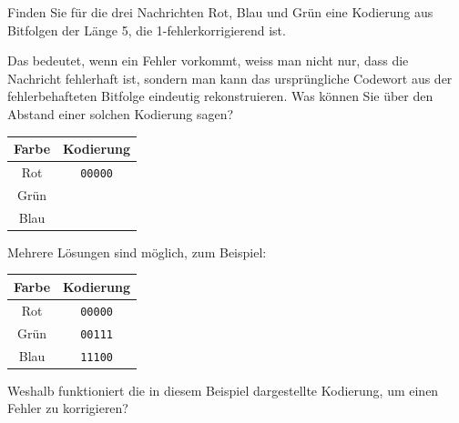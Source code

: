 \begin{myexercise}\label{ex:fehlerkorrektur}
	Finden Sie für die drei Nachrichten Rot, Blau und Grün eine Kodierung aus Bitfolgen der Länge 5, die 1-fehlerkorrigierend ist.

	Das bedeutet, wenn ein Fehler vorkommt, weiss man nicht nur, dass die Nachricht fehlerhaft ist, sondern man kann das ursprüngliche Codewort aus der fehlerbehafteten Bitfolge eindeutig rekonstruieren. Was können Sie über den Abstand einer solchen Kodierung sagen?

	\begin{table}[H]
		\centering
		\begin{tabular}{c|c}
			\textbf{Farbe} & \textbf{Kodierung} \\\midrule\midrule
			Rot            & \texttt{00000}     \\\midrule
			Grün           &                    \\\midrule
			Blau           &                    \\
		\end{tabular}
	\end{table}
	\begin{myanswer}
		Mehrere Lösungen sind möglich, zum Beispiel:

		\begin{table}[H]
			\centering
			\begin{tabular}{c|c}
				\textbf{Farbe} & \textbf{Kodierung} \\\midrule\midrule
				Rot            & \texttt{00000}     \\\midrule
				Grün           & \texttt{00111}     \\\midrule
				Blau           & \texttt{11100}     \\
			\end{tabular}
		\end{table}
		Weshalb funktioniert die in diesem Beispiel dargestellte Kodierung, um einen Fehler zu korrigieren?


\end{myanswer}
\end{myexercise}
